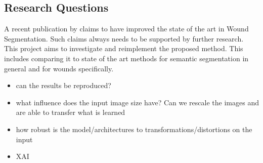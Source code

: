 \subsection{Research Questions}

A recent publication by \citeauthor{Oota_2023_WACV} claims to have improved the state of the art in Wound Segmentation. Such claims always needs to be supported by further research. This project aims to investigate and reimplement the proposed method. This includes comparing it to state of the art methods for semantic segmentation in general and for wounds specifically. 
\begin{itemize}
	\item can the results be reproduced?
	\item what influence does the input image size have? Can we rescale the images and are able to transfer what is learned
	\item how robust is the model/architectures to transformations/distortions on the input
	\item XAI
\end{itemize}